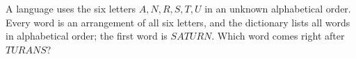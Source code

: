 A language uses the six letters $A,N,R,S,T,U$ in an unknown alphabetical order. Every word is an arrangement of all six letters, and the dictionary lists all words in alphabetical order; the first word is $SATURN$. Which word comes right after $TURANS$?

